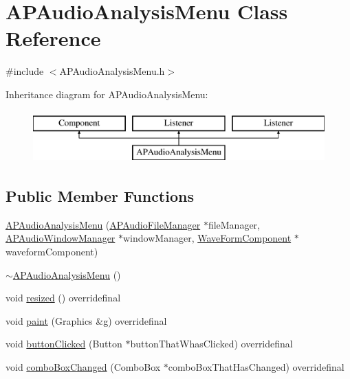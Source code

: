 \hypertarget{class_a_p_audio_analysis_menu}{\section{A\+P\+Audio\+Analysis\+Menu Class Reference}
\label{class_a_p_audio_analysis_menu}
}


{\ttfamily \#include $<$A\+P\+Audio\+Analysis\+Menu.\+h$>$}

Inheritance diagram for A\+P\+Audio\+Analysis\+Menu\+:\begin{figure}[H]
\begin{center}
\leavevmode
\includegraphics[height=2.000000cm]{class_a_p_audio_analysis_menu}
\end{center}
\end{figure}
\subsection*{Public Member Functions}
\begin{DoxyCompactItemize}
\item 
\hyperlink{class_a_p_audio_analysis_menu_a9480d205d954e579e923948456e69c46}{A\+P\+Audio\+Analysis\+Menu} (\hyperlink{class_a_p_audio_file_manager}{A\+P\+Audio\+File\+Manager} $\ast$file\+Manager, \hyperlink{class_a_p_audio_window_manager}{A\+P\+Audio\+Window\+Manager} $\ast$window\+Manager, \hyperlink{class_wave_form_component}{Wave\+Form\+Component} $\ast$waveform\+Component)
\item 
\hyperlink{class_a_p_audio_analysis_menu_aa1e4aec667d83a92538ba667b18186f2}{$\sim$\+A\+P\+Audio\+Analysis\+Menu} ()
\item 
void \hyperlink{class_a_p_audio_analysis_menu_a6d6edd5163984612f26da6edfd809306}{resized} () overridefinal
\item 
void \hyperlink{class_a_p_audio_analysis_menu_a6b5beba42dafb8645b1b30416c30fd04}{paint} (Graphics \&g) overridefinal
\item 
void \hyperlink{class_a_p_audio_analysis_menu_a4811c18104da88a1986d1e50a1796bb0}{button\+Clicked} (Button $\ast$button\+That\+Whas\+Clicked) overridefinal
\item 
void \hyperlink{class_a_p_audio_analysis_menu_a9f88e5c64f4e35cdb295c901b42682cb}{combo\+Box\+Changed} (Combo\+Box $\ast$combo\+Box\+That\+Has\+Changed) overridefinal
\end{DoxyCompactItemize}


